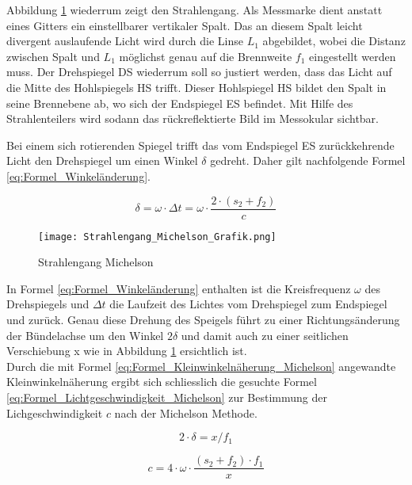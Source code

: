 Abbildung \ref{fig:Strahlengang Michelson} wiederrum zeigt den Strahlengang. Als Messmarke dient anstatt eines Gitters ein einstellbarer vertikaler Spalt. Das an diesem Spalt leicht divergent auslaufende Licht wird durch die Linse $L_{1}$ abgebildet, wobei die Distanz zwischen Spalt und $L_{1}$ möglichst genau auf die Brennweite $f_{1}$ eingestellt werden muss. Der Drehspiegel DS wiederrum soll so justiert werden, dass das Licht auf die Mitte des Hohlspiegels HS trifft. Dieser Hohlspiegel HS bildet den Spalt in seine Brennebene ab, wo sich der Endspiegel ES befindet. Mit Hilfe des Strahlenteilers wird sodann das rückreflektierte Bild im Messokular sichtbar.

Bei einem sich rotierenden Spiegel trifft das vom Endspiegel ES zurückkehrende Licht den Drehspiegel um einen Winkel $\delta$ gedreht. Daher gilt nachfolgende Formel \ref{eq:Formel_Winkeländerung}.

\begin{equation}
\delta = \omega\cdot\Delta t = \omega\cdot\dfrac{2\cdot(s_{2}+f_{2})}{c}
\label{eq:Formel_Winkeländerung}
\end{equation}

\begin{figure}[htb]
\texttt{[image: Strahlengang\_Michelson\_Grafik.png]}
\caption{Strahlengang Michelson}
\label{fig:Strahlengang Michelson}
\end{figure}

In Formel \ref{eq:Formel_Winkeländerung} enthalten ist die Kreisfrequenz $\omega$ des Drehspiegels und $\Delta t$ die Laufzeit des Lichtes vom Drehspiegel zum Endspiegel und zurück. Genau diese Drehung des Speigels führt zu einer Richtungsänderung der Bündelachse um den Winkel $2\delta$ und damit auch zu einer seitlichen Verschiebung x wie in Abbildung \ref{fig:Strahlengang Michelson} ersichtlich ist.\\
Durch die mit Formel \ref{eq:Formel_Kleinwinkelnäherung_Michelson} angewandte Kleinwinkelnäherung ergibt sich schliesslich die gesuchte Formel \ref{eq:Formel_Lichtgeschwindigkeit_Michelson} zur Bestimmung der Lichgeschwindigkeit $c$ nach der Michelson Methode.

\begin{equation}
2\cdot\delta = x/f_{1}
\label{eq:Formel_Kleinwinkelnäherung_Michelson}
\end{equation}

\begin{equation}
c = 4\cdot\omega\cdot\dfrac{(s_{2}+f_{2})\cdot f_{1}}{x}
\label{eq:Formel_Lichtgeschwindigkeit_Michelson}
\end{equation}

